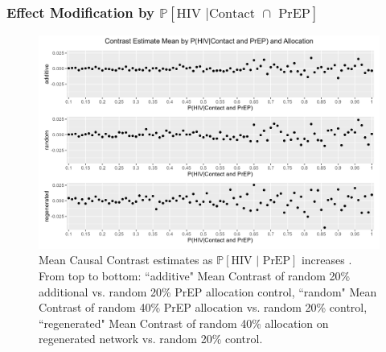 \documentclass{article}
\theoremstyle{definition}
\begin{document}
\subsubsection{Effect Modification by \texorpdfstring{$\mathbb{P}\left[\text{HIV } \vert \text {Contact } \cap \text{ PrEP}\right]$}{ℙ[HIV | PrEP]}}
\begin{figure}[H]
    \centering
    \includegraphics[width=\linewidth]{Figures/p2 Mean plots.png}
    \caption{Mean Causal Contrast estimates as $\mathbb{P}\left[\text{HIV } \vert \text{ PrEP}\right]$ increases . From top to bottom: ``additive" Mean Contrast of random 20\% additional vs. random 20\% PrEP allocation control, ``random" Mean Contrast of random 40\% PrEP allocation vs. random 20\% control, ``regenerated" Mean Contrast of random 40\% allocation on regenerated network vs. random 20\% control.}
    \label{fig:Figure S4.9}

\end{figure}
\end{document}
